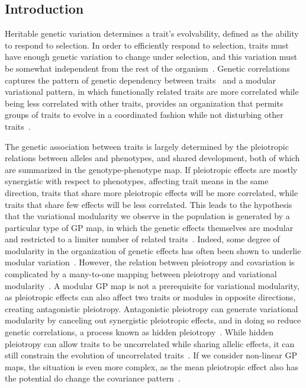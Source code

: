 \begin{refsection}


\section{Introduction}

Heritable genetic variation determines a trait's evolvability, defined as the
ability to respond to selection. In order to efficiently respond to selection,
traits must have enough genetic variation to change under selection, and this
variation must be somewhat independent from the rest of the
organism~\parencite{Lewontin1979-iw}. Genetic correlations captures the
pattern of genetic dependency between traits~\parencite{Lande1979-by,
Lande1983-ez} and a modular variational pattern, in which functionally related
traits are more correlated while being less correlated with other traits,
provides an organization that permits groups of traits to evolve in a
coordinated fashion while not disturbing other traits~\parencite{Olson1958-qk,
Cheverud1996-jw, Wagner2007-cx, Melo2016-yw}.

The genetic association between traits is largely determined by the
pleiotropic relations between alleles and phenotypes, and shared development,
both of which are summarized in the genotype-phenotype map. If pleiotropic
effects are mostly synergistic with respect to phenotypes, affecting trait
means in the same direction, traits that share more pleiotropic effects will
be more correlated, while traits that share few effects will be less
correlated. This leads to the hypothesis that the variational modularity we
observe in the population is generated by a particular type of GP map, in
which the genetic effects themselves are modular and restricted to a limiter
number of related traits~\parencite{Wagner1996-ui}. Indeed, some degree of
modularity in the organization of genetic effects has often been shown to
underlie modular variation~\parencite{Cheverud1997-rw, Mezey2000-rs, Kenney-
Hunt2008-bd, Porto2016-qc, Leamy1999-dm}. However, the relation between
pleiotropy and covariation is complicated by a many-to-one mapping between
pleiotropy and variational modularity~\parencite{Mitteroecker2009-jb}. A
modular GP map is not a prerequisite for variational modularity, as pleiotropic
effects can also affect two traits or modules in opposite directions, creating
antagonistic pleiotropy. Antagonistic pleiotropy can generate variational
modularity by canceling out synergistic pleiotropic effects, and in doing so
reduce genetic correlations, a process known as hidden
pleiotropy~\parencite{Turelli1985-ne, Pavlicev2011-xm}. While hidden
pleiotropy can allow traits to be uncorrelated while sharing allelic effects,
it can still constrain the evolution of uncorrelated
traits~\parencite{Baatz1997-hh}. If we consider non-linear GP maps, the
situation is even more complex, as the mean pleiotropic effect also has the
potential do change the covariance pattern~\parencite{Mitteroecker2009-jb}.


\end{refsection}
